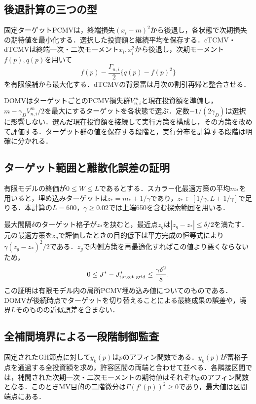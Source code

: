 \documentclass[11pt,a4paper]{article}
\numberwithin{equation}{section}
\numberwithin{table}{section}
\numberwithin{figure}{section}
\theoremstyle{plain}
\theoremstyle{definition}
\begin{document}
\subsection{後退計算の三つの型}
固定ターゲットPCMVは，終端損失$(x_i-m)^2$から後退し，各状態で次期損失の期待値を最小化する．選択した投資額と継続平均を保存する．cTCMV・dTCMVは終端一次・二次モーメント$x_i,x_i^2$から後退し，次期モーメント$f(p),q(p)$を用いて
\begin{equation}
f(p)-\frac{\Gamma_{n,i}}2\{q(p)-f(p)^2\}
\end{equation}
を有限候補から最大化する．dTCMVの背景富は月次の割引再帰と整合させる．

DOMVはターゲットごとのPCMV損失群$V_{n,i}^{m}$と現在投資額を準備し，$m-\gamma_DV_{n,i}^{m}/2$を最大にするターゲットを各状態で選ぶ．定数$-1/(2\gamma_D)$は選択に影響しない．選んだ現在投資額を接続して実行方策を構成し，その方策を改めて評価する．ターゲット群の値を保存する段階と，実行分布を計算する段階は明確に分かれる．

\subsection{ターゲット範囲と離散化誤差の証明}
有限モデルの終価が$0\leq W\leq L$であるとする．スカラー化最適方策の平均$m_*$を用いると，埋め込みターゲットは$z_*=m_*+1/\gamma$であり，$z_*\in[1/\gamma,L+1/\gamma]$で足りる．本計算の$L=600$，$\gamma\geq0.02$では上端650を含む探索範囲を用いる．

最大間隔$\delta$のターゲット格子が$z_*$を挟むと，最近点$z_g$は$|z_g-z_*|\leq\delta/2$を満たす．元の最適方策を$z_g$で評価したときの目的低下は平方完成の恒等式により$\gamma(z_g-z_*)^2/2$である．$z_g$で内側方策を再最適化すればこの値より悪くならないため，
\begin{equation}
0\leq J^*-J^*_{\rm target\ grid}\leq\frac{\gamma\delta^2}{8}.
\end{equation}
この証明は有限モデル内の局所PCMV埋め込み値についてのものである．DOMVが後続時点でターゲットを切り替えることによる最終成果の誤差や，境界$L$そのものの近似誤差を含まない．

\subsection{全補間境界による一段階制御監査}
固定されたGH節点に対して$y_k(p)$は$p$のアフィン関数である．$y_k(p)$が富格子点を通過する全投資額を求め，許容区間の両端と合わせて並べる．各隣接区間では，補間された次期一次・二次モーメントの期待値はそれぞれ$p$のアフィン関数となる．このときMV目的の二階微分は$\Gamma(f'(p))^2\geq0$であり，最大値は区間端点にある．
\end{document}
